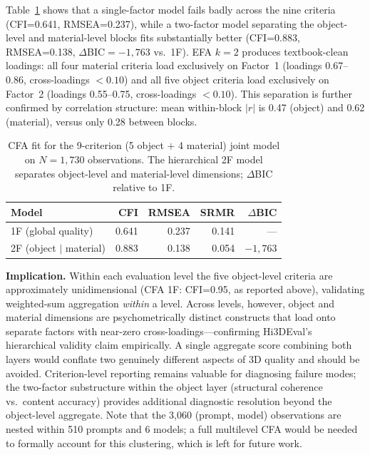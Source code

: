 \documentclass[10pt]{article}
\begin{document}
Table~\ref{tab:cfa_cross} shows that a single-factor model fails badly across
the nine criteria (CFI=0.641, RMSEA=0.237), while a two-factor model
separating the object-level and material-level blocks fits substantially
better (CFI=0.883, RMSEA=0.138, $\Delta$BIC$=-1{,}763$ vs.\ 1F).
EFA $k=2$ produces textbook-clean loadings: all four material criteria load
exclusively on Factor~1 (loadings 0.67--0.86, cross-loadings $<0.10$) and
all five object criteria load exclusively on Factor~2 (loadings 0.55--0.75,
cross-loadings $<0.10$).
This separation is further confirmed by correlation structure: mean
within-block $|r|$ is 0.47 (object) and 0.62 (material), versus only 0.28
between blocks.

\begin{table}[h]
\centering
\small
\caption{CFA fit for the 9-criterion (5 object $+$ 4 material) joint model
on $N=1{,}730$ observations. The hierarchical 2F model separates
object-level and material-level dimensions; $\Delta$BIC relative to 1F.}
\label{tab:cfa_cross}
\begin{tabular}{lrrrr}
\toprule
Model & CFI & RMSEA & SRMR & $\Delta$BIC \\
\midrule
1F (global quality)               & 0.641 & 0.237 & 0.141 & — \\
2F (object $|$ material) & 0.883 & 0.138 & 0.054 & $-1{,}763$ \\
\bottomrule
\end{tabular}
\end{table}

\textbf{Implication.}
Within each evaluation level the five object-level criteria are approximately
unidimensional (CFA 1F: CFI=0.95, as reported above), validating
weighted-sum aggregation \emph{within} a level.
Across levels, however, object and material dimensions are psychometrically
distinct constructs that load onto separate factors with near-zero
cross-loadings---confirming Hi3DEval's hierarchical validity claim
empirically.
A single aggregate score combining both layers would conflate two
genuinely different aspects of 3D quality and should be avoided.
Criterion-level reporting remains valuable for diagnosing failure modes;
the two-factor substructure within the object layer (structural coherence
vs.\ content accuracy) provides additional diagnostic resolution beyond the
object-level aggregate.
Note that the 3{,}060 (prompt, model) observations are nested within 510
prompts and 6 models; a full multilevel CFA would be needed to formally
account for this clustering, which is left for future work.
\end{document}
